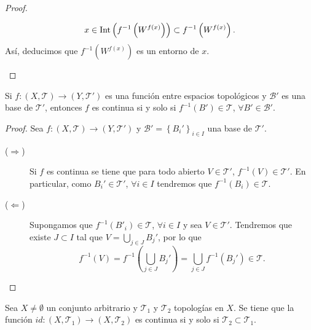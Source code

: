 \begin{proof}
\begin{description}
	\[x \in \operatorname{Int}\left(f^{-1}\left(W^{f\left(x\right)}\right)\right)\subset f^{-1}\left(W^{f\left(x\right)}\right) .\]
	Así, deducimos que $\displaystyle f^{-1}\left(W^{f\left(x\right)}\right) $ es un entorno de $\displaystyle x $. 
\end{description}
\end{proof}

\begin{colorary}
Si $\displaystyle f : \left(X, \mathcal{T}\right)\to \left(Y, \mathcal{T}'\right) $ es una función entre espacios topológicos y $\displaystyle \mathcal{B}' $ es una base de $\displaystyle \mathcal{T}' $, entonces $\displaystyle f $ es continua si y solo si $\displaystyle f^{-1}\left(B'\right)\in \mathcal{T} $, $\displaystyle \forall B' \in \mathcal{B}' $.
\end{colorary}

\begin{proof}
	Sea $\displaystyle f : \left(X, \mathcal{T}\right)\to \left(Y, \mathcal{T}'\right) $ y $\displaystyle \mathcal{B}' = \left\{ B_{i}'\right\} _{i \in I} $ una base de $\displaystyle \mathcal{T}' $. 
	\begin{description}
	\item[($\displaystyle \Rightarrow $)] Si $\displaystyle f $ es continua se tiene que para todo abierto $\displaystyle V \in \mathcal{T}'$, $\displaystyle f^{-1}\left(V\right)\in\mathcal{T}' $. En particular, como $\displaystyle B_{i}'\in \mathcal{T}' $, $\displaystyle \forall i \in I $ tendremos que $\displaystyle f^{-1}\left(B_{i}\right)\in \mathcal{T} $. 
	\item[($\displaystyle \Leftarrow $)] Supongamos que $\displaystyle f^{-1}\left(B'_{i}\right)\in \mathcal{T} $, $\displaystyle \forall i \in I $ y sea $\displaystyle V \in \mathcal{T}' $. Tendremos que existe $\displaystyle J \subset I $ tal que $\displaystyle V = \bigcup_{ j \in J}B_{j}' $, por lo que 
		\[f^{-1}\left(V\right)=f^{-1}\left(\bigcup_{j \in J}B_{j}'\right)=\bigcup_{j \in J}f^{-1}\left(B_{j}'\right)\in \mathcal{T} .\]
	\end{description}
\end{proof}
\begin{observation}
Sea $\displaystyle X \neq \emptyset $ un conjunto arbitrario y $\displaystyle \mathcal{T}_{1} $ y $\displaystyle \mathcal{T}_{2} $ topologías en $\displaystyle X $. Se tiene que la función $\displaystyle id : \left(X, \mathcal{T}_{1}\right)\to \left(X, \mathcal{T}_{2}\right) $ es continua si y solo si $\displaystyle \mathcal{T}_{2}\subset \mathcal{T}_{1} $. 
\end{observation}

